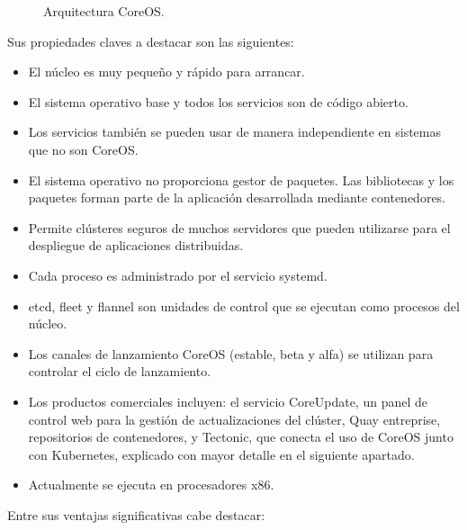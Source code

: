 \begin{figure}[H]
\caption{Arquitectura CoreOS.\label{fig:figure_placement_example}}
\end{figure}

Sus propiedades claves a destacar son las siguientes:

\begin{itemize}
\item El núcleo es muy pequeño y rápido para arrancar.
\item El sistema operativo base y todos los servicios son de código abierto.
\item Los servicios también se pueden usar de manera independiente en sistemas que no son CoreOS.
\item El sistema operativo no proporciona gestor de paquetes. Las bibliotecas y los paquetes forman parte de la aplicación desarrollada mediante contenedores.
\item Permite clústeres seguros de muchos servidores que pueden utilizarse para el despliegue de aplicaciones distribuidas.
\item Cada proceso es administrado por el servicio systemd.
\item etcd, fleet y flannel son unidades de control que se ejecutan como procesos del núcleo.
\item Los canales de lanzamiento CoreOS (estable, beta y alfa) se utilizan para controlar el ciclo de lanzamiento.
\item Los productos comerciales incluyen: el servicio CoreUpdate, un panel de control web para la gestión de actualizaciones del clúster, Quay entreprise, repositorios de contenedores, y Tectonic, que conecta el uso de CoreOS junto con Kubernetes, explicado con mayor detalle en el siguiente apartado.
\item Actualmente se ejecuta en procesadores x86.
\end{itemize}

Entre sus ventajas significativas cabe destacar:

